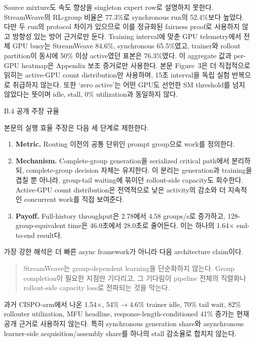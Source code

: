 Source mixture도 속도 향상을 singleton expert row로 설명하지 못한다. StreamWeave의 RL-group
비율은 77.3\%로 synchronous run의 52.4\%보다 높았다. 다만 두 run의 protocol 차이가 있으므로
이를 정규화된 fairness proof로 사용하지 않고 방향성 있는 방어 근거로만 둔다. Training interval에
맞춘 GPU telemetry에서 전체 GPU busy는 StreamWeave 84.6\%, synchronous 65.5\%였고, trainer와
rollout partition이 동시에 50\% 이상 active였던 표본은 76.3\%였다. 이 aggregate 값과 per-GPU
heatmap은 Appendix 보조 증거로만 사용한다. 본문 Figure~3은 더 직접적으로 읽히는 active-GPU count
distribution만 사용하며, 15초 interval을 독립 실험 반복으로 취급하지 않는다. 또한 `zero active'는
어떤 GPU도 선언한 SM threshold를 넘지 않았다는 뜻이며 idle, stall, 0\% utilization과 동일하지 않다.

B.4 공개 주장 규율

본문의 실행 효율 주장은 다음 세 단계로 제한한다.

\begin{enumerate}
  \item \textbf{Metric.} Routing 이전의 공통 단위인 prompt group으로 work를 정의한다.
  \item \textbf{Mechanism.} Complete-group generation을 serialized critical path에서 분리하되,
        complete-group decision 자체는 유지한다. 이 분리는 generation과 training을 겹칠 뿐 아니라,
        group-tail waiting에 묶이던 rollout-side capacity도 회수한다. Active-GPU count distribution은
        전역적으로 낮은 activity의 감소와 더 지속적인 concurrent work를 직접 보여준다.
  \item \textbf{Payoff.} Full-history throughput은 2.78에서 4.58 groups/s로 증가하고,
        128-group-equivalent time은 46.0초에서 28.0초로 줄어든다. 이는 하나의 1.64$\times$
        end-to-end result다.
\end{enumerate}

가장 강한 해석은 더 빠른 async framework가 아니라 다음 architecture claim이다.

\begin{quote}
StreamWeave는 group-dependent learning을 단순화하지 않는다. Group completion이 필요한 지점만
기다리고, 그 기다림이 pipeline 전체의 직렬화나 rollout-side capacity loss로 전파되는 것을 막는다.
\end{quote}

과거 CISPO-arm에서 나온 1.54$\times$, \(54\%\to4.6\%\) trainer idle, 70\% tail wait,
82\% rollouter utilization, MFU headline, response-length-conditioned 41\% 증가는 현재 공개
근거로 사용하지 않는다. 특히 synchronous generation share와 asynchronous learner-side
acquisition/assembly share를 하나의 stall 감소율로 합치지 않는다.

